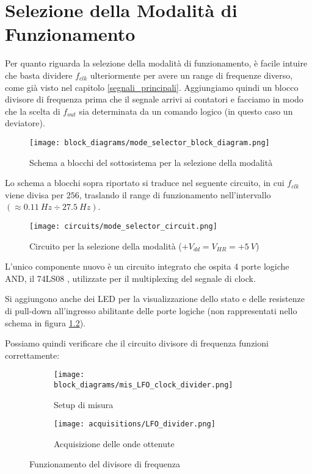 \chapter{Selezione della Modalità di Funzionamento}


Per quanto riguarda la selezione della modalità di funzionamento, è facile intuire che basta
dividere $f_{clk}$ ulteriormente per avere un range di frequenze diverso, come già visto nel
capitolo \ref{segnali_principali}. Aggiungiamo quindi un blocco divisore di frequenza prima
che il segnale arrivi ai contatori e facciamo in modo che la scelta di $f_{out}$ sia
determinata da un comando logico (in questo caso un deviatore).

\begin{figure}[H]
    \centering
    \texttt{[image: block\_diagrams/mode\_selector\_block\_diagram.png]}
    \caption{Schema a blocchi del sottosistema per la selezione della modalità}
    \label{mode_selector_block_diagram}
\end{figure}

Lo schema a blocchi sopra riportato si traduce nel seguente circuito, in cui $f_{clk}$
viene divisa per $256$, traslando il range di funzionamento nell'intervallo
$(\approx0.11\ Hz\div27.5\ Hz)$.

\begin{figure}[H]
    \centering
    \texttt{[image: circuits/mode\_selector\_circuit.png]}
    \caption{Circuito per la selezione della modalità ($+V_{dd}=V_{HR}=+5\ V$)}
    \label{mode_selector_circuit}
\end{figure}

L'unico componente nuovo è un circuito integrato che ospita 4 porte logiche AND, il 74LS08
\cite{74ls08}, utilizzate per il multiplexing del segnale di clock.

Si aggiungono anche dei LED per la visualizzazione dello stato e delle resistenze di pull-down
all'ingresso abilitante delle porte logiche (non rappresentati nello schema in figura
\ref{mode_selector_circuit}).

Possiamo quindi verificare che il circuito divisore di frequenza funzioni correttamente:

\begin{figure}[H]
    \centering

    \begin{subfigure}{.5\textwidth}
        \centering
        \texttt{[image: block\_diagrams/mis\_LFO\_clock\_divider.png]}
        \caption{Setup di misura}
        \label{mis_LFO_clock_divider}
    \end{subfigure}%
    \begin{subfigure}{.5\textwidth}
        \centering
        \texttt{[image: acquisitions/LFO\_divider.png]}
        \caption{Acquisizione delle onde ottenute}
        \label{LFO_divider}
    \end{subfigure}

    \caption{Funzionamento del divisore di frequenza}
    \label{freq_divider}
\end{figure}

